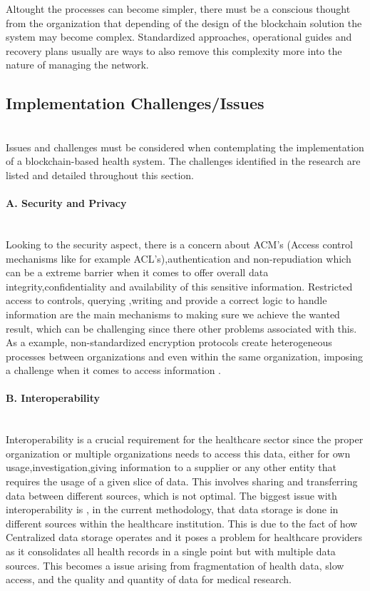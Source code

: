 Altought the processes can become simpler, there must be a conscious thought from the organization that depending of the design of the blockchain solution the system may become complex. Standardized approaches, operational guides and recovery plans usually are ways to also remove this complexity more into the nature of managing the network.

\subsection{Implementation Challenges/Issues} \mbox{}\\
Issues and challenges must be considered when contemplating the implementation of a blockchain-based health system. The challenges identified in the research are listed and detailed throughout this section.

\paragraph{A. Security and Privacy} \mbox{}\\
Looking to the security aspect, there is a concern about ACM's (Access control mechanisms like for example ACL's),authentication and non-repudiation which can be a extreme barrier when it comes to offer overall data integrity,confidentiality and availability of this sensitive information. Restricted access to controls, querying ,writing and provide a correct logic to handle information are the main mechanisms to making sure we achieve the wanted result, which can be challenging since there other problems associated with this. As a example, non-standardized encryption protocols create heterogeneous processes between organizations and even within the same organization, imposing a challenge when it comes to access information \cite{med-rec}.

\paragraph{B. Interoperability} \mbox{}\\
Interoperability is a crucial requirement for the healthcare sector since the proper organization or multiple organizations needs to access this data, either for own usage,investigation,giving information to a supplier or any other entity that requires the usage of a given slice of data. This involves sharing and transferring data between different sources, which is not optimal. The biggest issue with interoperability is , in the current methodology, that data storage is done in different sources within the healthcare institution. This is due to the fact of how Centralized data storage operates and it poses a problem for healthcare providers as it consolidates all health records in a single point but with multiple data sources. This becomes a issue arising from fragmentation of health data, slow access, and the quality and quantity of data for medical research.

